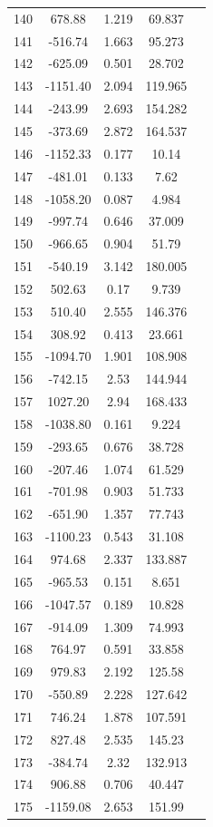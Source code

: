 {\begin{longtable}{ccccc}
140 & 678.88 & 1.219 & 69.837 \\
141 & -516.74 & 1.663 & 95.273 \\
142 & -625.09 & 0.501 & 28.702 \\
143 & -1151.40 & 2.094 & 119.965 \\
144 & -243.99 & 2.693 & 154.282 \\
145 & -373.69 & 2.872 & 164.537 \\
146 & -1152.33 & 0.177 & 10.14 \\
147 & -481.01 & 0.133 & 7.62 \\
148 & -1058.20 & 0.087 & 4.984 \\
149 & -997.74 & 0.646 & 37.009 \\
150 & -966.65 & 0.904 & 51.79 \\
151 & -540.19 & 3.142 & 180.005 \\
152 & 502.63 & 0.17 & 9.739 \\
153 & 510.40 & 2.555 & 146.376 \\
154 & 308.92 & 0.413 & 23.661 \\
155 & -1094.70 & 1.901 & 108.908 \\
156 & -742.15 & 2.53 & 144.944 \\
157 & 1027.20 & 2.94 & 168.433 \\
158 & -1038.80 & 0.161 & 9.224 \\
159 & -293.65 & 0.676 & 38.728 \\
160 & -207.46 & 1.074 & 61.529 \\
161 & -701.98 & 0.903 & 51.733 \\
162 & -651.90 & 1.357 & 77.743 \\
163 & -1100.23 & 0.543 & 31.108 \\
164 & 974.68 & 2.337 & 133.887 \\
165 & -965.53 & 0.151 & 8.651 \\
166 & -1047.57 & 0.189 & 10.828 \\
167 & -914.09 & 1.309 & 74.993 \\
168 & 764.97 & 0.591 & 33.858 \\
169 & 979.83 & 2.192 & 125.58 \\
170 & -550.89 & 2.228 & 127.642 \\
171 & 746.24 & 1.878 & 107.591 \\
172 & 827.48 & 2.535 & 145.23 \\
173 & -384.74 & 2.32 & 132.913 \\
174 & 906.88 & 0.706 & 40.447 \\
175 & -1159.08 & 2.653 & 151.99 \\

\end{longtable}}
